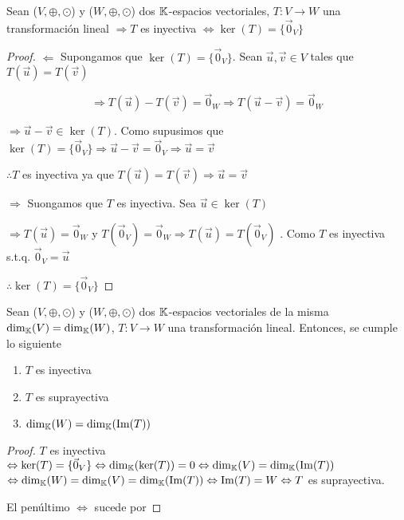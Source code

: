 \begin{theorem}
    Sean ($V, \oplus, \odot$) y ($W, \oplus, \odot$) dos $\mathbb{K}$-espacios vectoriales, $T : V \to W$ una transformación lineal $\Rightarrow T$ es inyectiva $\iff \ker(T) =  \{ \vec{0}_V \}$
\end{theorem}

\begin{proof}
    $\Leftarrow$ Supongamos que $\ker(T) =  \{ \vec{0}_V \}$. Sean $\vec{u}, \vec{v} \in V$ tales que $T(\vec{u}) = T(\vec{v})$

    $$\Rightarrow T(\vec{u}) - T(\vec{v}) = \vec{0}_W \Rightarrow T(\vec{u} - \vec{v}) = \vec{0}_W$$

    $\Rightarrow \vec{u} - \vec{v} \in \ker(T)$. Como supusimos que $\ker(T) =  \{ \vec{0}_V \} \Rightarrow \vec{u} - \vec{v} = \vec{0}_V \Rightarrow \vec{u} = \vec{v}$ 

    $\therefore T$ es inyectiva ya que $T(\vec{u}) = T(\vec{v}) \Rightarrow \vec{u} = \vec{v}$

    $\Rightarrow$ Suongamos que $T$ es inyectiva. Sea $\vec{u} \in \ker(T)$

    $\Rightarrow T(\vec{u}) = \vec{0}_W$ y $T(\vec{0}_V) = \vec{0}_W \Rightarrow T(\vec{u}) = T(\vec{0}_V)$ . Como $T$ es inyectiva s.t.q. $\vec{0}_V = \vec{u}$

    $\therefore \ker(T) =  \{ \vec{0}_V \}$
\end{proof}

\begin{theorem} \label{theom219}
     Sean ($V, \oplus, \odot$) y ($W, \oplus, \odot$) dos $\mathbb{K}$-espacios vectoriales de la misma $ {\dim}_{\mathbb{K}}(V) =  {\dim}_{\mathbb{K}}(W)$, $T : V \to W$ una transformación lineal. Entonces, se cumple lo siguiente

     \begin{enumerate}
         \item $T$ es inyectiva
         \item $T$ es suprayectiva
         \item $ {\dim}_{\mathbb{K}}(W) =  {\dim}_{\mathbb{K}}(\Im(T))$
     \end{enumerate}
\end{theorem}

\begin{proof}
    $T$ es inyectiva $\Leftrightarrow \ker(T) =  \{ \vec{0}_V \} \Leftrightarrow {\dim}_{\mathbb{K}}(\ker(T)) = 0 \Leftrightarrow  {\dim}_{\mathbb{K}}(V) = {\dim}_{\mathbb{K}}(\Im(T)) $ $\Leftrightarrow {\dim}_{\mathbb{K}}(W) = {\dim}_{\mathbb{K}}(V) = {\dim}_{\mathbb{K}}(\Im(T)) \Leftrightarrow \Im(T) = W \Leftrightarrow T$ es suprayectiva.

    El penúltimo $\iff$ sucede por 
\end{proof}

